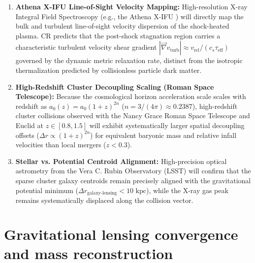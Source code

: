 \documentclass[aps,prd,reprint,superscriptaddress,nofootinbib,floatfix,amsmath,amssymb]{revtex4-2}
\begin{document}
\begin{enumerate}
    \item \textbf{Athena X-IFU Line-of-Sight Velocity Mapping:} High-resolution X-ray Integral Field Spectroscopy (e.g., the Athena X-IFU \cite{Barret2023_Athena}) will directly map the bulk and turbulent line-of-sight velocity dispersion of the shock-heated plasma. CR predicts that the post-shock stagnation region carries a characteristic turbulent velocity shear gradient $|\vec{\nabla} v_{\text{turb}}| \approx v_{\text{rel}} / (c_s \tau_{\text{eff}})$ governed by the dynamic metric relaxation rate, distinct from the isotropic thermalization predicted by collisionless particle dark matter.
    \item \textbf{High-Redshift Cluster Decoupling Scaling (Roman Space Telescope):} Because the cosmological horizon acceleration scale scales with redshift as $a_0(z) = a_0 (1+z)^{2n}$ ($n = 3/(4\pi) \approx 0.2387$), high-redshift cluster collisions observed with the Nancy Grace Roman Space Telescope \cite{Spergel2015_WFIRST} and Euclid at $z \in [0.8, 1.5]$ will exhibit systematically larger spatial decoupling offsets ($\Delta r \propto (1+z)^{2n}$) for equivalent baryonic mass and relative infall velocities than local mergers ($z < 0.3$).
    \item \textbf{Stellar vs. Potential Centroid Alignment:} High-precision optical astrometry from the Vera C. Rubin Observatory (LSST) will confirm that the sparse cluster galaxy centroids remain precisely aligned with the gravitational potential minimum ($\Delta r_{\text{galaxy-lensing}} < 10\text{ kpc}$), while the X-ray gas peak remains systematically displaced along the collision vector.
\end{enumerate}

\section{Gravitational lensing convergence and mass reconstruction}
\label{sec:lensing}
\end{document}
